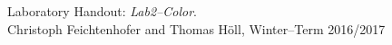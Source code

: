 \documentclass[
a4paper,     %
11pt         %
]{scrartcl}  %
\begin{document}


\begin{thebibliography}{XX}
  Laboratory Handout: \textit{Lab2--Color}. \\
    Christoph Feichtenhofer and Thomas Höll, Winter--Term 2016/2017
\end{thebibliography}


% 

% 
\end{document}
